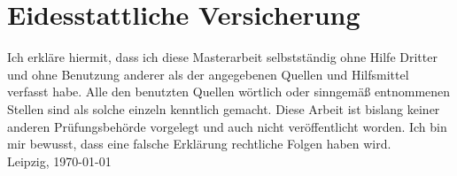 \chapter*{Eidesstattliche Versicherung}

Ich erkläre hiermit, dass ich diese Masterarbeit selbstständig ohne Hilfe Dritter und ohne Benutzung anderer als der angegebenen Quellen und Hilfsmittel verfasst habe. Alle den benutzten Quellen wörtlich oder sinngemäß entnommenen Stellen sind als solche einzeln kenntlich gemacht. Diese Arbeit ist bislang keiner anderen Prüfungsbehörde vorgelegt und auch nicht veröffentlicht worden. Ich bin mir bewusst, dass eine falsche Erklärung rechtliche Folgen haben wird.
\\[3cm]
Leipzig, \today